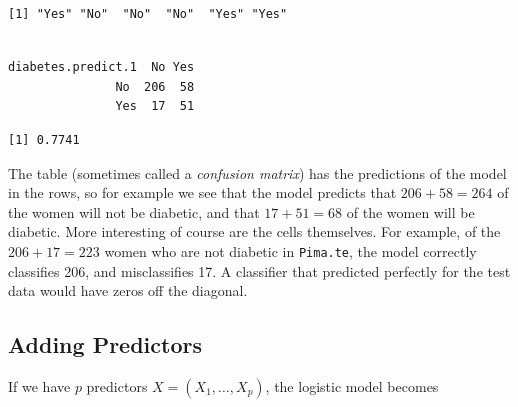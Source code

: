 \documentclass[
]{krantz}
\makeatletter
\newenvironment{Shaded}{\begin{snugshade}}{\end{snugshade}}
\newcommand{\DecValTok}[1]{\textcolor[rgb]{0.06,0.06,0.06}{#1}}
\newcommand{\FloatTok}[1]{\textcolor[rgb]{0.06,0.06,0.06}{#1}}
\newcommand{\KeywordTok}[1]{\textcolor[rgb]{0.27,0.27,0.27}{\textbf{#1}}}
\newcommand{\NormalTok}[1]{#1}
\newcommand{\OperatorTok}[1]{\textcolor[rgb]{0.43,0.43,0.43}{\textbf{#1}}}
\newcommand{\StringTok}[1]{\textcolor[rgb]{0.5,0.5,0.5}{#1}}
\newenvironment{kframe}{%
\medskip{}
\setlength{\fboxsep}{.8em}
 \def\at@end@of@kframe{}%
 \ifinner\ifhmode%
  \def\at@end@of@kframe{\end{minipage}}%
  \begin{minipage}{\columnwidth}%
 \fi\fi%
 \def\FrameCommand##1{\hskip\@totalleftmargin \hskip-\fboxsep
 \colorbox{shadecolor}{##1}\hskip-\fboxsep
     \hskip-\linewidth \hskip-\@totalleftmargin \hskip\columnwidth}%
 \MakeFramed {\advance\hsize-\width
   \@totalleftmargin\z@ \linewidth\hsize
   \@setminipage}}%
 {\par\unskip\endMakeFramed%
 \at@end@of@kframe}
\renewenvironment{Shaded}{\begin{kframe}}{\end{kframe}}
\makeatother
\begin{document}
\begin{verbatim}
[1] "Yes" "No"  "No"  "No"  "Yes" "Yes"
\end{verbatim}

\begin{Shaded}
\end{Shaded}

\begin{verbatim}
                  
diabetes.predict.1  No Yes
               No  206  58
               Yes  17  51
\end{verbatim}

\begin{Shaded}
\end{Shaded}

\begin{verbatim}
[1] 0.7741
\end{verbatim}

The table (sometimes called a \emph{confusion matrix}) has the predictions of the model in the rows, so for example we see that the model predicts that \(206 + 58 = 264\) of the women will not be diabetic, and that \(17+51 = 68\) of the women will be diabetic. More interesting of course are the cells themselves. For example, of the \(206 + 17 = 223\) women who are not diabetic in \texttt{Pima.te}, the model correctly classifies 206, and misclassifies 17. A classifier that predicted perfectly for the test data would have zeros off the diagonal.

\hypertarget{adding-predictors}{%
\subsection{Adding Predictors}\label{adding-predictors}}

If we have \(p\) predictors \(X = (X_1, \dots, X_p)\), the logistic model becomes
\end{document}
